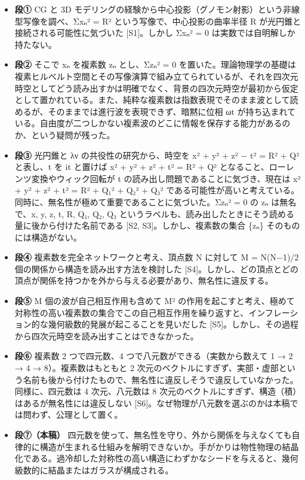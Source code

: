 \documentclass[
  a4paper,
]{ltjsarticle}
\providecommand{\tightlist}{%
  \setlength{\itemsep}{0pt}\setlength{\parskip}{0pt}}
\begin{document}
\begin{itemize}
\tightlist
\item
  \textbf{段①} CG と 3D
  モデリングの経験から中心投影（グノモン射影）という非線型写像を調べ、Σxₙ²
  = R² という写像で、中心投影の曲率半径 R
  が光円錐と接続される可能性に気づいた {[}S1{]}。しかし Σxₙ² = 0
  は実数では自明解しか持たない。
\item
  \textbf{段②} そこで xₙ を複素数 zₙ とし、Σzₙ² = 0
  を置いた。理論物理学の基礎は複素ヒルベルト空間とその写像演算で組み立てられているが、それを四次元時空としてどう読み出すかは明確でなく、背景の四次元時空が最初から仮定として置かれている。また、純粋な複素数は指数表現でそのまま波として読めるが、そのままでは進行波を表現できず、暗黙に位相
  ωt
  が持ち込まれている。自由度が二つしかない複素波のどこに情報を保存する能力があるのか、という疑問が残った。
\item
  \textbf{段③} 光円錐と λν の共役性の研究から、時空を x² + y² + z² − t²
  = R² + Q² と表し、t を it と置けば x² + y² + z² + t² = R² + Q²
  となること、ローレンツ変換やウィック回転が t
  の読み出し問題であることに気づき、現在は x² + y² + z² + t² = R² + Q₁²
  + Q₂² + Q₃²
  である可能性が高いと考えている。同時に、無名性が極めて重要であることに気づいた。Σzₙ²
  = 0 の zₙ は無名で、x, y, z, t, R, Q₁, Q₂, Q₃
  というラベルも、読み出したときにそう読める量に後から付けた名前である
  {[}S2, S3{]}。しかし、複素数の集合 \{zₙ\} そのものには構造がない。
\item
  \textbf{段④} 複素数を完全ネットワークと考え、頂点数 N に対して M =
  N(N−1)/2 個の関係から構造を読み出す方法を検討した
  {[}S4{]}。しかし、どの頂点とどの頂点が関係を持つかを外から与える必要があり、無名性に違反する。
\item
  \textbf{段⑤} M 個の波が自己相互作用も含めて M²
  の作用を起こすと考え、極めて対称性の高い複素数の集合でこの自己相互作用を繰り返すと、インフレーション的な幾何級数的発展が起こることを見いだした
  {[}S5{]}。しかし、その過程から四次元時空を読み出すことはできなかった。
\item
  \textbf{段⑥} 複素数 2 つで四元数、4 つで八元数ができる（実数から数えて
  1 → 2 → 4 → 8）。複素数はもともと 2
  次元のベクトルにすぎず、実部・虚部という名前も後から付けたもので、無名性に違反しそうで違反していなかった。同様に、四元数は
  4 次元、八元数は 8
  次元のベクトルにすぎず、構造（積）はあるが無名性には違反しない
  {[}S6{]}。なぜ物理が八元数を選ぶのかは本稿では問わず、公理として置く。
\item
  \textbf{段⑦（本稿）}
  四元数を使って、無名性を守り、外から関係を与えなくても自律的に構造が生まれる仕組みを解明できないか。手がかりは物性物理の結晶化である。過冷却した対称性の高い構造にわずかなシードを与えると、幾何級数的に結晶またはガラスが構成される。
\end{itemize}
\end{document}
